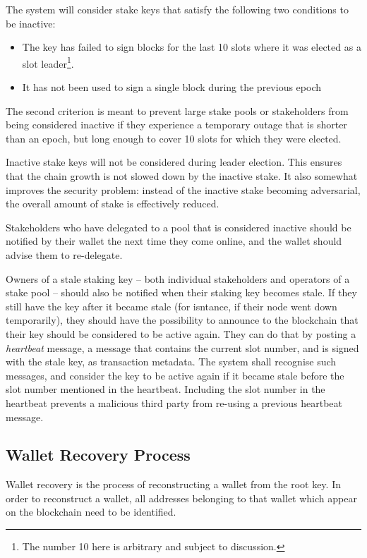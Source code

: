 \documentclass[11pt,a4paper]{article}
\begin{document}
The system will consider stake keys that satisfy the following two
conditions to be inactive:

\begin{itemize}
\item
  The key has failed to sign blocks for the last 10 slots where it was
  elected as a slot leader\footnote{The number 10 here is arbitrary and
    subject to discussion.}.
\item
  It has not been used to sign a single block during the previous epoch
\end{itemize}

The second criterion is meant to prevent large stake pools or
stakeholders from being considered inactive if they experience a
temporary outage that is shorter than an epoch, but long enough to cover
10 slots for which they were elected.

Inactive stake keys will not be considered during leader election. This
ensures that the chain growth is not slowed down by the inactive stake.
It also somewhat improves the security problem: instead of the inactive
stake becoming adversarial, the overall amount of stake is effectively
reduced.

Stakeholders who have delegated to a pool that is considered inactive
should be notified by their wallet the next time they come online, and
the wallet should advise them to re-delegate.

Owners of a stale staking key -- both individual stakeholders and
operators of a stake pool -- should also be notified when their staking
key becomes stale. If they still have the key after it became stale (for
isntance, if their node went down temporarily), they should have the
possibility to announce to the blockchain that their key should be
considered to be active again. They can do that by posting a
\emph{heartbeat} message, a message that contains the current slot
number, and is signed with the stale key, as transaction metadata. The
system shall recognise such messages, and consider the key to be active
again if it became stale before the slot number mentioned in the
heartbeat. Including the slot number in the heartbeat prevents a
malicious third party from re-using a previous heartbeat message.

\subsection{Wallet Recovery Process}\label{wallet-recovery-process}

Wallet recovery is the process of reconstructing a wallet from the root
key. In order to reconstruct a wallet, all addresses belonging to that
wallet which appear on the blockchain need to be identified.
\end{document}
